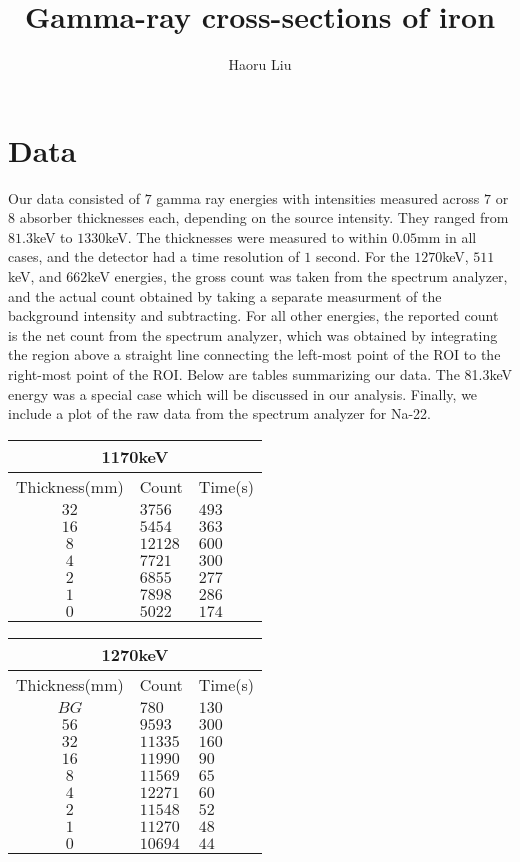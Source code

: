\documentclass{amsart}
\title{Gamma-ray cross-sections of iron}
\author{Haoru Liu}
\begin{document}
\maketitle
\tableofcontents
\section{Data}
Our data consisted of $7$ gamma ray energies with intensities measured across $7$ or $8$ absorber thicknesses each, depending on the source intensity. They ranged from $81.3$keV to $1330$keV. The thicknesses were measured to within $0.05$mm in all cases, and the detector had a time resolution of $1$ second. For the $1270$keV, $511$keV, and $662$keV energies, the gross count was taken from the spectrum analyzer, and the actual count obtained by taking a separate measurment of the background intensity and subtracting. For all other energies, the reported count is the net count from the spectrum analyzer, which was obtained by integrating the region above a straight line connecting the left-most point of the ROI to the right-most point of the ROI. Below are tables summarizing our data. The 81.3keV energy was a special case which will be discussed in our analysis. Finally, we include a plot of the raw data from the spectrum analyzer for Na-22.

\begin{tabular}[t]{|c|l|l|}
\hline
\multicolumn{3}{|c|}{1170keV}\\
\hline
Thickness(mm) & Count & Time(s)\\
$32$ & $3756$ & $493$ \\
$16$ & $5454$ & $363$ \\
$8$ & $12128$ & $600$ \\
$4$ & $7721$ & $300$ \\
$2$ & $6855$ & $277$ \\
$1$ & $7898$ & $286$ \\
$0$ & $5022$ & $174$ \\
\hline
\end{tabular}
\qquad
\begin{tabular}[t]{|c|l|l|}
\hline
\multicolumn{3}{|c|}{1270keV}\\
\hline
Thickness(mm) & Count & Time(s)\\
$BG$ & $780$ & $130$ \\
$56$ & $9593$ & $300$ \\
$32$ & $11335$ & $160$ \\
$16$ & $11990$ & $90$ \\
$8$ & $11569$ & $65$ \\
$4$ & $12271$ & $60$ \\
$2$ & $11548$ & $52$ \\
$1$ & $11270$ & $48$ \\
$0$ & $10694$ & $44$ \\
\hline
\end{tabular}
\newline
\end{document}
